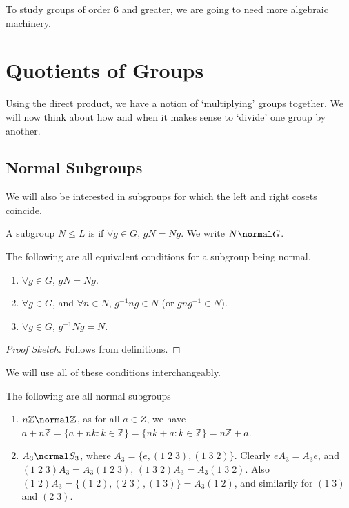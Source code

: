 \documentclass[a4paper]{scrartcl}
\begin{document}
To study groups of order $6$ and greater, we are going to need more algebraic machinery.
 
\section{Quotients of Groups}

Using the direct product, we have a notion of `multiplying' groups together. We will now think about how and when it makes sense to `divide' one group by another. 

\subsection{Normal Subgroups}

We will also be interested in subgroups for which the left and right cosets coincide.

\begin{definition}
	A subgroup $N \leq L$ is  if $\forall g \in G$, $gN = Ng$. We write $N \normal G$.
\end{definition}

\begin{proposition}
	The following are all equivalent conditions for a subgroup being normal.
	\begin{enumerate}[label=(\roman*)]
		\item $\forall g \in G$, $gN = Ng$.
		\item $\forall g \in G$, and $\forall n \in N$, $g^{-1} n g \in N$ (or $g n g^{-1} \in N$).
		\item $\forall g \in G$, $g^{-1} N g = N$.
	\end{enumerate}
\end{proposition}
\begin{proof}[Proof Sketch]
	Follows from definitions.
\end{proof}

We will use all of these conditions interchangeably.

\begin{example}
	The following are all normal subgroups
	\begin{enumerate}[label=(\roman*)]
		\item $n\mathbb{Z} \normal \mathbb{Z}$, as for all $a \in Z$, we have
		$a + n\mathbb{Z} = \{a + nk : k \in \mathbb{Z}\} = \{nk + a : k \in \mathbb{Z}\} = n\mathbb{Z} + a$.
		\item 
		$A_3 \normal S_3$, where $A_3 = \{e, (1\; 2\; 3), (1\; 3\; 2)\}$. Clearly $eA_3 = A_3 e$, and $(1\;2\;3)A_3 = A_3 (1\; 2\; 3)$, $(1\; 3\; 2)A_3 = A_3 (1\; 3\; 2)$. Also $(1\; 2)A_3 = \{(1\; 2), (2\; 3), (1\; 3)\} = A_3(1\; 2)$, and similarily for $(1\;3)$ and $(2\; 3)$.
	\end{enumerate}
\end{example}
\end{document}
